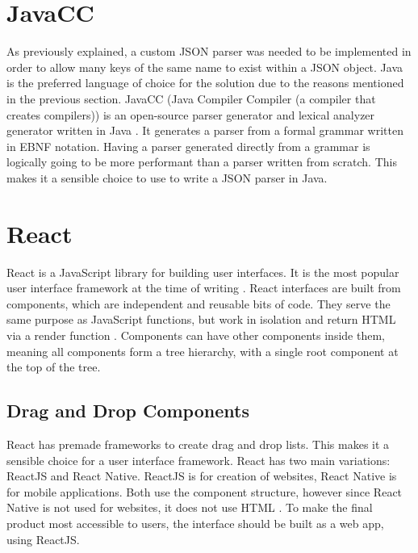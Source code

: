 \section{JavaCC}

As previously explained, a custom JSON parser was needed to be implemented in order to allow many keys of the same name to exist within a JSON object. Java is the preferred language of choice for the solution due to the reasons mentioned in the previous section. JavaCC (Java Compiler Compiler (a compiler that creates compilers)) is an open-source parser generator and lexical analyzer generator written in Java \cite{javacc}. It generates a parser from a formal grammar written in EBNF notation. Having a parser generated directly from a grammar is logically going to be more performant than a parser written from scratch. This makes it a
 sensible choice to use to write a JSON parser in Java.

\section{React}

React is a JavaScript library for building user interfaces. It is the most popular user interface framework at the time of writing \cite{top_user_interface_libraries}. React interfaces are built from components, which are independent and reusable bits of code. They serve the same purpose as JavaScript functions, but work in isolation and return HTML via a render function \cite{react}. Components can have other components inside them, meaning all components form a tree hierarchy, with a single root component at the top of the tree. 
\subsection{Drag and Drop Components}
React has premade frameworks to create drag and drop lists. This makes it a sensible choice for a user interface framework. React has two main variations: ReactJS and React Native. ReactJS is for creation of websites, React Native is for mobile applications. Both use the component structure, however since React Native is not used for websites, it does not use HTML \cite{react_native}. To make the final product most accessible to users, the interface should be built as a web app, using ReactJS.
